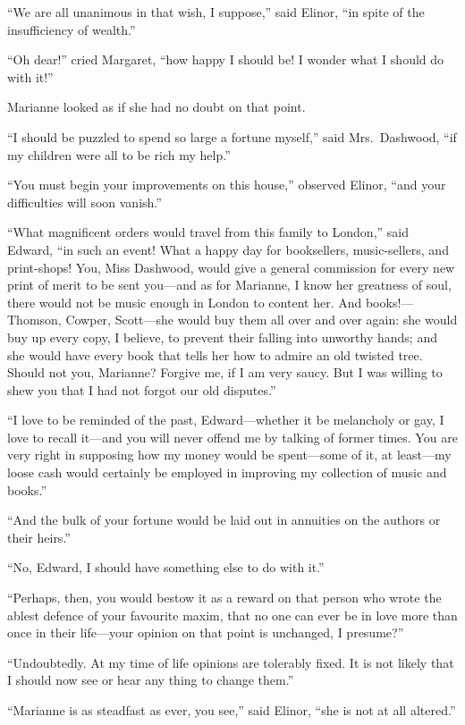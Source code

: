 \documentclass{article}
\begin{document}
``We are all unanimous in that wish, I suppose,''
said Elinor, ``in spite of the insufficiency of wealth.''

``Oh dear!'' cried Margaret, ``how happy I should be!
I wonder what I should do with it!''

Marianne looked as if she had no doubt on that point.

``I should be puzzled to spend so large a fortune myself,''
said Mrs.\ Dashwood, ``if my children were all to be rich
my help.''

``You must begin your improvements on this house,''
observed Elinor, ``and your difficulties will soon vanish.''

``What magnificent orders would travel from this family
to London,'' said Edward, ``in such an event!  What a happy
day for booksellers, music-sellers, and print-shops!  You,
Miss Dashwood, would give a general commission for every
new print of merit to be sent you---and as for Marianne,
I know her greatness of soul, there would not be music enough
in London to content her.  And books!---Thomson, Cowper,
Scott---she would buy them all over and over again: she
would buy up every copy, I believe, to prevent their
falling into unworthy hands; and she would have every
book that tells her how to admire an old twisted tree.
Should not you, Marianne?  Forgive me, if I am very saucy.
But I was willing to shew you that I had not forgot our
old disputes.''

``I love to be reminded of the past, Edward---whether it
be melancholy or gay, I love to recall it---and you
will never offend me by talking of former times.
You are very right in supposing how my money would be
spent---some of it, at least---my loose cash would certainly
be employed in improving my collection of music and books.''

``And the bulk of your fortune would be laid out
in annuities on the authors or their heirs.''

``No, Edward, I should have something else to do
with it.''

``Perhaps, then, you would bestow it as a reward on that
person who wrote the ablest defence of your favourite maxim,
that no one can ever be in love more than once in their
life---your opinion on that point is unchanged, I presume?''

``Undoubtedly. At my time of life opinions are tolerably fixed.
It is not likely that I should now see or hear any thing to
change them.''

``Marianne is as steadfast as ever, you see,'' said Elinor,
``she is not at all altered.''
\end{document}

